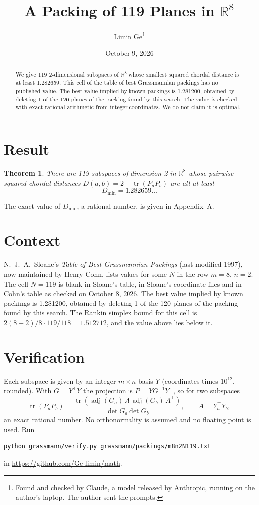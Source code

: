\documentclass[11pt,a4paper]{article}
\title{A Packing of 119 Planes in $\mathbb{R}^{8}$}
\author{Limin Ge\thanks{Found and checked by Claude, a model released by Anthropic, running on the author's laptop. The author sent the prompts.}}
\date{October 9, 2026}
\newtheorem*{theorem}{Theorem}
\begin{document}
\maketitle
\begin{abstract}
We give 119 2-dimensional subspaces of $\mathbb{R}^{8}$ whose smallest squared chordal distance is at least 1.282659. This cell of the table of best Grassmannian packings has no published value. The best value implied by known packings is 1.281200, obtained by deleting 1 of the 120 planes of the packing found by this search. The value is checked with exact rational arithmetic from integer coordinates. We do not claim it is optimal.
\end{abstract}

\section{Result}
\begin{theorem}
There are 119 subspaces of dimension 2 in $\mathbb{R}^{8}$ whose pairwise squared chordal distances $D(a,b) = 2 - \operatorname{tr}(P_aP_b)$ are all at least
\[ D_{\min} = 1.282659\ldots \]
\end{theorem}
The exact value of $D_{\min}$, a rational number, is given in Appendix~A.


\section{Context}
N.~J.~A.~Sloane's \emph{Table of Best Grassmannian Packings} (last modified 1997), now maintained by Henry Cohn, lists values for some $N$ in the row $m=8$, $n=2$. The cell $N=119$ is blank in Sloane's table, in Sloane's coordinate files and in Cohn's table as checked on October 8, 2026. The best value implied by known packings is 1.281200, obtained by deleting 1 of the 120 planes of the packing found by this search. The Rankin simplex bound for this cell is $2(8-2)/8\cdot 119/118 = 1.512712$, and the value above lies below it.


\section{Verification}
Each subspace is given by an integer $m\times n$ basis $Y$ (coordinates times $10^{12}$, rounded). With $G=Y^\top Y$ the projection is $P=YG^{-1}Y^\top$, so for two subspaces
\[ \operatorname{tr}(P_aP_b)=\frac{\operatorname{tr}(\operatorname{adj}(G_a)\,A\,\operatorname{adj}(G_b)\,A^\top)}{\det G_a\det G_b},\qquad A=Y_a^\top Y_b, \]
an exact rational number. No orthonormality is assumed and no floating point is used. Run
\begin{verbatim}
python grassmann/verify.py grassmann/packings/m8n2N119.txt
\end{verbatim}
in \url{https://github.com/Ge-limin/math}.
\end{document}
